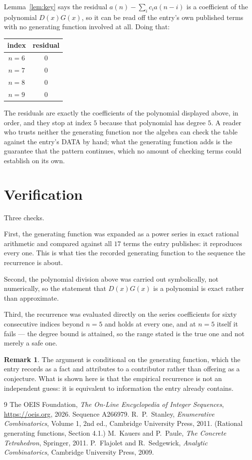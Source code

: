 \documentclass[11pt,a4paper]{article}
\theoremstyle{plain}
\theoremstyle{definition}
\newtheorem{remark}[theorem]{Remark}
\begin{document}
Lemma~\ref{lem:key} says the residual $a(n)-\sum_ic_ia(n-i)$ is a coefficient of the
polynomial $D(x)G(x)$, so it can be read off the entry's own published terms with no
generating function involved at all. Doing that:
\begin{center}
\begin{tabular}{cc}
index & residual \\ \hline
$n=6$ & $0$ \\
$n=7$ & $0$ \\
$n=8$ & $0$ \\
$n=9$ & $0$
\end{tabular}
\end{center}
The residuals are exactly the coefficients of the polynomial displayed above, in order, and
they stop at index $5$ because that polynomial has degree $5$. A reader who trusts
neither the generating function nor the algebra can check the table against the entry's DATA
by hand; what the generating function adds is the guarantee that the pattern continues, which
no amount of checking terms could establish on its own.

\section{Verification}

Three checks.

First, the generating function was expanded as a power series in exact rational arithmetic and
compared against all $17$ terms the entry publishes: it reproduces every one. This is
what ties the recorded generating function to the sequence the recurrence is about.

Second, the polynomial division above was carried out symbolically, not numerically, so the
statement that $D(x)G(x)$ is a polynomial is exact rather than approximate.

Third, the recurrence was evaluated directly on the series coefficients for sixty consecutive
indices beyond $n=5$ and holds at every one, and at $n=5$ itself it fails --- the
degree bound is attained, so the range stated is the true one and not merely a safe one.

\begin{remark}
The argument is conditional on the generating function, which the entry records as a fact and
attributes to a contributor rather than offering as a conjecture. What is shown here is that
the empirical recurrence is not an independent guess: it is equivalent to information the
entry already contains.
\end{remark}

\begin{thebibliography}{9}
 The OEIS Foundation, \emph{The On-Line Encyclopedia of Integer
Sequences}, \url{https://oeis.org}, 2026. Sequence A266979.
 R.~P.~Stanley, \emph{Enumerative Combinatorics}, Volume 1, 2nd ed.,
Cambridge University Press, 2011. (Rational generating functions, Section 4.1.)
 M.~Kauers and P.~Paule, \emph{The Concrete Tetrahedron}, Springer, 2011.
 P.~Flajolet and R.~Sedgewick, \emph{Analytic Combinatorics}, Cambridge
University Press, 2009.
\end{thebibliography}
\end{document}
